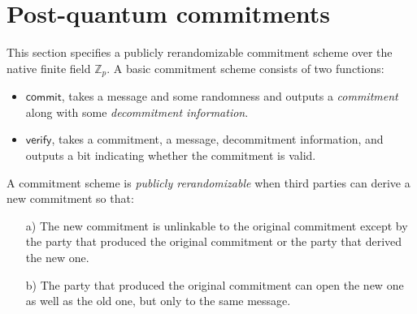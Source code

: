 \section{Post-quantum commitments}
\label{section:commitments}

This section specifies a publicly rerandomizable commitment scheme over the native finite field $\mathbb{Z}_p$. A basic commitment scheme consists of two functions:
\begin{itemize}
 \item $\mathsf{commit}$, takes a message and some randomness and outputs a \emph{commitment} along with some \emph{decommitment information}.
 \item $\mathsf{verify}$, takes a commitment, a message, decommitment information, and outputs a bit indicating whether the commitment is valid.
\end{itemize}

A commitment scheme is \emph{publicly rerandomizable} when third parties can derive a new commitment so that:
\begin{itemize}
\item[a)] The new commitment is unlinkable to the original commitment except by the party that produced the original commitment or the party that derived the new one.
\item[b)] The party that produced the original commitment can open the new one as well as the old one, but only to the same message.
\end{itemize}

